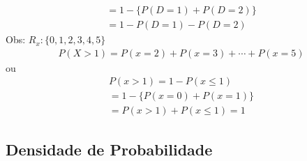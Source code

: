 \begin{description}
\begin{enumerate}[label=(\alph*)]
\begin{align*}
             = 1- \{ P(D=1)+ P(D=2) \}\\
             = 1- P(D=1)- P(D=2)
           \end{align*}
           Obs: $R_{x}: \{0,1,2,3,4,5 \}$
           \begin{align*}
             P(X>1)=P(x=2)+ P(x=3)+\cdots+P(x=5)
           \end{align*}
           ou
           \begin{align*}
             P(x>1)= 1-P(x\le 1)\\
             = 1- \{ P(x=0)+ P(x=1) \}\\
             = P(x>1)+ P(x\le 1)=1
           \end{align*}
       \end{enumerate}
   \end{description}
   \subsection{Densidade de Probabilidade}
